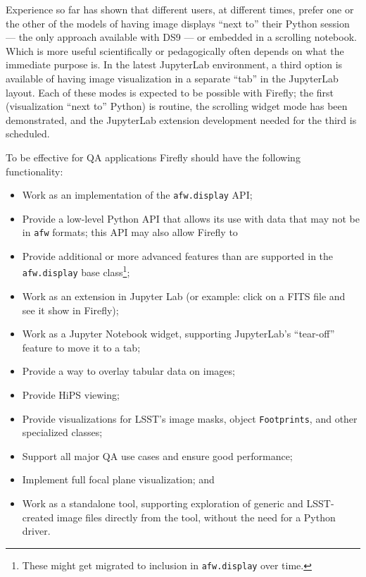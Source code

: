 Experience so far has shown that different users, at different times, prefer one or the other of the models of having image displays ``next to'' their Python session --- the only approach available with DS9 --- or embedded in a scrolling notebook.
Which is more useful scientifically or pedagogically often depends on what the immediate purpose is.
In the latest JupyterLab environment, a third option is available of having image visualization in a separate ``tab'' in the JupyterLab layout.
Each of these modes is expected to be possible with Firefly; the first (visualization ``next to'' Python) is routine, the scrolling widget mode has been demonstrated, and the JupyterLab extension development needed for the third is scheduled.

To be effective for QA applications Firefly should have the following functionality:

\begin{itemize}
  \item{Work as an implementation of the \verb|afw.display| API;}
  \item{Provide a low-level Python API that allows its use with data that may not be in \verb|afw| formats; this API may also allow Firefly to}
  \item{Provide additional or more advanced features than are supported in the \verb|afw.display| base class\footnote{These might get migrated to inclusion in \texttt{afw.display} over time.};}
  \item{Work as an extension in Jupyter Lab (or example: click on a FITS file and see it show in Firefly);}
  \item{Work as a Jupyter Notebook widget, supporting JupyterLab's ``tear-off'' feature to move it to a tab;}
  \item{Provide a way to overlay tabular data on images;}
  \item{Provide HiPS viewing;}
  \item{Provide visualizations for LSST's image masks, object \verb|Footprints|, and other specialized classes;}
  \item{Support all major QA use cases and ensure good performance;}
  \item{Implement full focal plane visualization; and}
  \item{Work as a standalone tool, supporting exploration of generic and LSST-created image files directly from the tool, without the need for a Python driver.}
\end{itemize}

